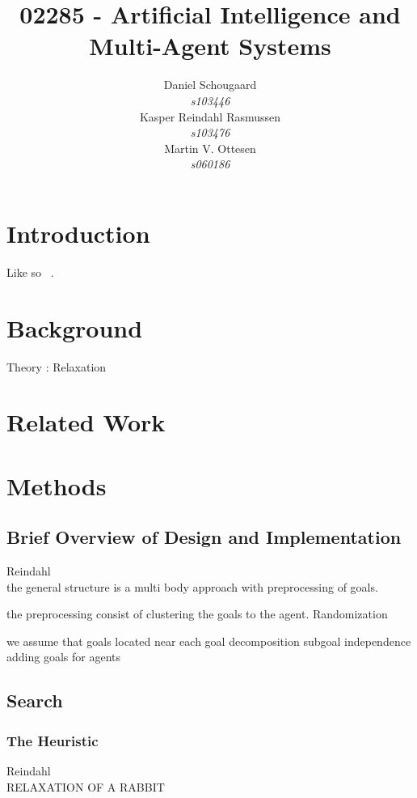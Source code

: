 \documentclass[10pt,a4paper]{article}
\author{
    Daniel Schougaard \\ \textit{s103446} \\
    Kasper Reindahl Rasmussen\\ \textit{s103476}\\ 
    Martin V. Ottesen\\ \textit{s060186} 
}
\title{ 
    \Huge{02285 - Artificial Intelligence and Multi-Agent Systems}
}
\begin{document}



\clearpage\maketitle
\thispagestyle{empty}
\pagebreak
\pagestyle{plain}
\tableofcontents
\pagebreak


\section{Introduction}
	Like so ~\cite{book2015}. 
\section{Background}
	Theory : Relaxation

\section{Related Work}

\section{Methods}
	\subsection{Brief Overview of Design and Implementation}
		Reindahl\\
		the general structure is a multi body approach with preprocessing of goals.
		
		the preprocessing consist of clustering the goals to the agent.
			Randomization
		
		we assume that goals located near each 
		goal decomposition 
			subgoal independence
			adding goals for agents
		
				
	\subsection{Search}
		\subsubsection{The Heuristic}
			Reindahl \\
			RELAXATION OF A RABBIT
\end{document}
